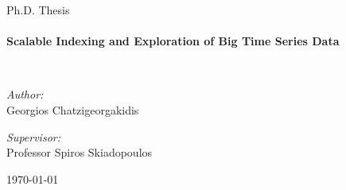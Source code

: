 \begin{titlepage}
\begin{center}



\vspace{2cm}


\Large Ph.D. Thesis\\[0.5cm]

\HRule \\[0.4cm]
{ \huge \bfseries Scalable Indexing and Exploration of Big Time Series Data\\[0.4cm] }

\HRule \\[1.5cm]

\begin{minipage}{0.4\textwidth}
\begin{flushleft} \large
\textit{Author:} \\
Georgios Chatzigeorgakidis
\end{flushleft}
\end{minipage}
\begin{minipage}{0.58\textwidth}
\begin{flushright} \large
\textit{Supervisor:} \\
Professor Spiros Skiadopoulos
\end{flushright}
\end{minipage}

\vfill

{\large \today}


\end{center}
\end{titlepage}
